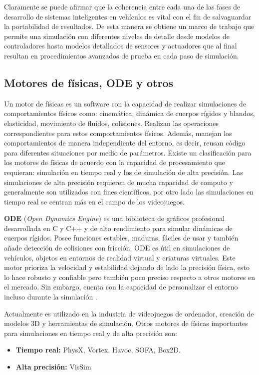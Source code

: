 Claramente se puede afirmar que la coherencia entre cada una de las fases de desarrollo de sistemas inteligentes en vehículos es vital con el fin de salvaguardar la portabilidad de resultados. De esta manera se obtiene un marco de trabajo que permite una simulación con diferentes niveles de detalle desde modelos de controladores hasta modelos detallados de sensores y actuadores que al final resultan en procedimientos avanzados de prueba en cada paso de simulación.

\subsection{Motores de físicas, ODE y otros} \label{sub:motores_de_físicas_ODE_y_otros}

Un motor de físicas es un software con la capacidad de realizar simulaciones de comportamientos físicos como: cinemática, dinámica de cuerpos rígidos y blandos, elasticidad, movimiento de fluidos, colisiones. Realizan las operaciones correspondientes para estos comportamientos físicos. Además, manejan los comportamientos de manera independiente del entorno, es decir, reusan código para diferentes situaciones por medio de parámetros. Existe un clasificación para los motores de físicas de acuerdo con la capacidad de procesamiento que requieran: simulación en tiempo real y los de simulación de alta precisión. Las simulaciones de alta precisión requieren de mucha capacidad de computo y generalmente son utilizados con fines científicos, por otro lado las simulaciones en tiempo real se centran más en el campo de los videojuegos.

\textbf{ODE} (\textit{Open Dynamics Engine}) es una biblioteca de gráficos profesional desarrollada en C y C++ y de alto rendimiento para simular dinámicas de cuerpos rígidos. Posee funciones estables, maduras, fáciles de usar y también añade detección de colisiones con fricción. ODE es útil en simulaciones de vehículos, objetos en entornos de realidad virtual y criaturas virtuales. Este motor prioriza la velocidad y estabilidad dejando de lado la precisión física, esto lo hace robusto y confiable pero también poco preciso respecto a otros motores en el mercado. Sin embargo, cuenta con la capacidad de personalizar el entorno incluso durante la simulación \cite{ode}.

Actualmente es utilizado en la industria de videojuegos de ordenador, creación de modelos 3D y herramientas de simulación. Otros motores de físicas importantes para simulaciones en tiempo real y de alta precisión son:
\begin{itemize}
    \item \textbf{Tiempo real:} PhysX, Vortex, Havoc, SOFA, Box2D.
    \item \textbf{Alta precisión:} VisSim
\end{itemize}


